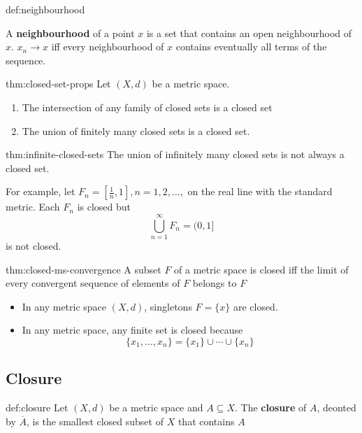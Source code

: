\documentclass[landscape, 8pt]{extarticle}
\begin{document}
\begin{multicols}{3}
\begin{dfn}{def:neighbourhood}{}
    \longrule{0.08ex}

    A \textbf{neighbourhood} of a point $x$ is a set that contains an open neighbourhood of $x$.  $x_{n}\to x$ iff every neighbourhood of $x$ contains eventually all terms of the sequence.
\end{dfn}

\begin{thm}{thm:closed-set-props}{}
    Let $(X, d)$ be a metric space.
    \begin{enumerate}
        \item The intersection of any family of closed sets is a closed set
        \item The union of finitely many closed sets is a closed set.
    \end{enumerate}
\end{thm}

\begin{thm}{thm:infinite-closed-sets}{}
    The union of infinitely many closed sets is not always a closed set.

    For example, let $F_{n} = [\frac{1}{n}, 1], n=1,2,\dots,$ on the real line with the standard metric.
    Each $F_{n}$ is closed but
    \[\bigcup\limits_{n = 1}^{\infty}F_{n} = (0,1]\]
    is not closed.
\end{thm}

\begin{thm}[]{thm:closed-ms-convergence}{}
    A subset $F$ of a metric space is closed iff the limit of every convergent sequence of elements of $F$ belongs to $F$
\end{thm}

\newpage

\begin{itemize}
    \item In any metric space $(X,d)$, singletons $F = \{x\}$ are closed.
    \item In any metric space, any finite set is closed because
        \[\{x_{1},\dots,x_{n}\} = \{x_{1}\}\cup \cdots \cup \{x_{n}\}\]
\end{itemize}


\subsection{Closure}

\begin{dfn}[Closure]{def:closure}{}
    Let $(X, d)$ be a metric space and $A \subseteq X$. The \textbf{closure} of $A$, deonted by $\overline{A}$, is the smallest closed subset of $X$ that contains $A$


\end{dfn}
\end{multicols}
\end{document}
